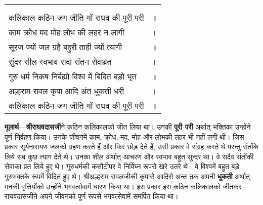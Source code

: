 
{
{\bfseries
\setlength{\mylenone}{0pt}
\settowidth{\mylentwo}{}
\setlength{\mylenone}{\maxof{\mylenone}{\mylentwo}}
\settowidth{\mylentwo}{कलिकाल कठिन जग जीति यों राघव की पूरी परी}
\setlength{\mylenone}{\maxof{\mylenone}{\mylentwo}}
\settowidth{\mylentwo}{काम क्रोध मद मोह लोभ की लहर न लागी}
\setlength{\mylenone}{\maxof{\mylenone}{\mylentwo}}
\settowidth{\mylentwo}{सूरज ज्यों जल ग्रहै बहुरी ताही ज्यों त्यागी}
\setlength{\mylenone}{\maxof{\mylenone}{\mylentwo}}
\settowidth{\mylentwo}{सुंदर सील स्वभाव सदा संतन सेवाब्रत}
\setlength{\mylenone}{\maxof{\mylenone}{\mylentwo}}
\settowidth{\mylentwo}{गुरु धर्म निकष निर्बह्यो विश्व में बिदित बड़ो भृत}
\setlength{\mylenone}{\maxof{\mylenone}{\mylentwo}}
\settowidth{\mylentwo}{अल्हराम रावल कृपा आदि अंत धुकती धरी}
\setlength{\mylenone}{\maxof{\mylenone}{\mylentwo}}
\settowidth{\mylentwo}{कलिकाल कठिन जग जीति यों राघव की पूरी परी}
\setlength{\mylenone}{\maxof{\mylenone}{\mylentwo}}
\setlength{\mylentwo}{\baselineskip}
\setlength{\mylenone}{\mylenone + 1pt}
\begin{longtable}[l]{@{\hspace*{\mylen}}>{\setlength\parfillskip{0pt}}p{\mylenone}@{}@{}l@{}}
 & \\[-\the\mylentwo]
\centering{॥ १३५ \hspace*{-1.5mm}॥} & \\ \nopagebreak
कलिकाल कठिन जग जीति यों राघव की पूरी परी & ॥\\
काम क्रोध मद मोह लोभ की लहर न लागी & ।\\ \nopagebreak
सूरज ज्यों जल ग्रहै बहुरी ताही ज्यों त्यागी & ॥\\
सुंदर सील स्वभाव सदा संतन सेवाब्रत & ।\\ \nopagebreak
गुरु धर्म निकष निर्बह्यो विश्व में बिदित बड़ो भृत & ॥\\
अल्हराम रावल कृपा आदि अंत धुकती धरी & ।\\ \nopagebreak
कलिकाल कठिन जग जीति यों राघव की पूरी परी & ॥
\end{longtable}
}
}
\begin{sloppypar}\justifying{}
\textbf{मूलार्थ}—\textbf{श्रीराघवदासजी}ने कठिन कलिकालको जीत लिया था। उनकी \textbf{पूरी परी} अर्थात् भक्तिका उन्होंने पूर्ण निर्वहण किया। उनके जीवनमें काम, क्रोध, मद, मोह और लोभकी लहर भी नहीं लगी थी। जिस प्रकार सूर्यनारायण जलको ग्रहण करते हैं और फिर छोड़ देते हैं, उसी प्रकार वे संग्रह करते थे परन्तु संतोंके लिये सब कुछ त्याग देते थे। उनका शील अर्थात् आचरण और स्वभाव बहुत सुन्दर था। वे सदैव संतोंकी सेवाका व्रत लिये हुए थे। गुरुधर्मकी कसौटीपर वे निर्विघ्न रूपसे खरे उतरे थे। वे विश्वमें बहुत बड़े गुरुभक्तके रूपमें विदित हुए थे। श्रीअल्हराम रावलजीकी कृपासे आदिसे अन्त तक अपनी \textbf{धुकती} अर्थात् मनकी वृत्तियोंको उन्होंने भगवत्सेवामें धारण किया था। इस प्रकार इस कठिन कलिकालको जीतकर राघवदासजीने अपने जीवनको पूर्ण रूपसे भगवत्सेवामें समर्पित किया था।
\end{sloppypar}
